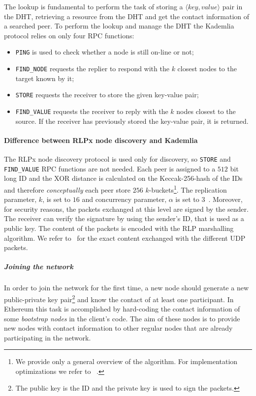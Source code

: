 The lookup is fundamental to perform the task of storing a $\langle key,
value\rangle$ pair in the DHT, retrieving a resource from the DHT and get
the contact information of a searched peer.
To perform the lookup and manage the DHT the Kademlia protocol relies on only
four RPC functions:
\begin{itemize}
    \item \verb|PING| is used to check whether a node is still on-line
    or not;
    \item \verb|FIND_NODE| requests the replier to respond with the $k$ closest
    nodes to the target known by it;
    \item \verb|STORE| requests the receiver to store the given
    key-value pair;
    \item \verb|FIND_VALUE| requests the receiver to reply with the $k$
    nodes closest to the source. If the receiver has previously stored the
    key-value pair, it is returned.
\end{itemize}


\paragraph{Difference between RLPx node discovery and Kademlia}
\label{sec:rlpx-discovery}
The RLPx node discovery protocol is used only for discovery, so
\verb|STORE| and \verb|FIND_VALUE| RPC functions are not
needed.
Each peer is assigned to a $512$ bit long ID and the XOR distance is calculated
on the Keccak-256-hash of the IDs and therefore
\emph{conceptually} each peer store $256$ $k$-buckets\footnote{
    We provide only a general overview of the algorithm. For implementation
    optimizations we refer to ~\cite{bib:kademlia}.}.
The replication parameter, $k$, is set to $16$ and concurrency parameter,
$\alpha$ is set to $3$~\cite{bib:rlpx-discovery-protocol}. Moreover, for
security reasons, the packets exchanged at this level are signed by the sender.
The receiver can verify the signature by using the sender's ID, that is used as
a public key. The content of the packets is encoded with the RLP marshalling
algorithm. We refer to~\cite{bib:rlpx-discovery-protocol} for the exact content
exchanged with the different UDP packets.





\subparagraph{Joining the network}
In order to join the network for the first time, a new node should generate a
new public-private key pair\footnote{The public key is the ID and the private
key is used to sign the packets.} and know the contact of at least one
participant. In Ethereum this task is accomplished by hard-coding the contact
information of some \textit{bootstrap nodes} in the client's code. The aim of
these nodes is to provide new nodes with contact information to other regular
nodes that are already participating in the network.

